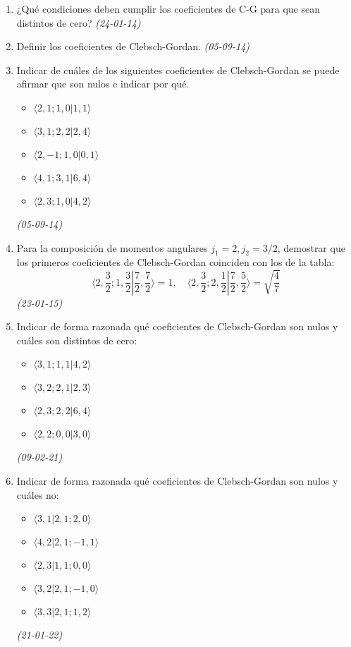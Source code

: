 \begin{enumerate}
    
    \item ¿Qué condiciones deben cumplir los coeficientes de C-G para que sean distintos de cero? \textit{(24-01-14)}
    
    \item Definir los coeficientes de Clebsch-Gordan. \textit{(05-09-14)}
    
    \item Indicar de cuáles de los siguientes coeficientes de Clebsch-Gordan se puede afirmar que son nulos e indicar por qué.
        \begin{itemize}
            \item \( \langle 2, 1; 1, 0 | 1, 1 \rangle \)
            \item \( \langle 3, 1; 2, 2 | 2, 4 \rangle \)
            \item \( \langle 2, -1; 1, 0 | 0, 1 \rangle \)
            \item \( \langle 4, 1; 3, 1 | 6, 4 \rangle \)
            \item \( \langle 2, 3; 1, 0 | 4, 2 \rangle \)
        \end{itemize} \textit{(05-09-14)}

        \item Para la composición de momentos angulares \( j_1 = 2, j_2 = 3/2 \), demostrar que los primeros coeficientes de Clebsch-Gordan coinciden con los de la tabla:
        \[
        \langle 2, \frac{3}{2}; 1, \frac{3}{2} | \frac{7}{2}, \frac{7}{2} \rangle = 1, \quad \langle 2, \frac{3}{2}; 2, \frac{1}{2} | \frac{7}{2}, \frac{5}{2} \rangle = \sqrt{\frac{4}{7}}
        \] \textit{(23-01-15)}

        \item Indicar de forma razonada qué coeficientes de Clebsch-Gordan son nulos y cuáles son distintos de cero:
        \begin{itemize}
            \item \(\langle 3, 1; 1, 1 | 4, 2 \rangle\)
            \item \(\langle 3, 2; 2, 1 | 2, 3 \rangle\)
            \item \(\langle 2, 3; 2, 2 | 6, 4 \rangle\)
            \item \(\langle 2, 2; 0, 0 | 3, 0 \rangle\)
        \end{itemize} \textit{(09-02-21)}
    
        \item Indicar de forma razonada qué coeficientes de Clebsch-Gordan son nulos y cuáles no:
        \begin{itemize}
            \item \(\langle 3, 1 | 2, 1; 2, 0 \rangle\)
            \item \(\langle 4, 2 | 2, 1; -1, 1 \rangle\)
            \item \(\langle 2, 3 | 1, 1; 0, 0 \rangle\)
            \item \(\langle 3, 2 | 2, 1; -1, 0 \rangle\)
            \item \(\langle 3, 3 | 2, 1; 1, 2 \rangle\)
        \end{itemize} \textit{(21-01-22)}


\end{enumerate}
